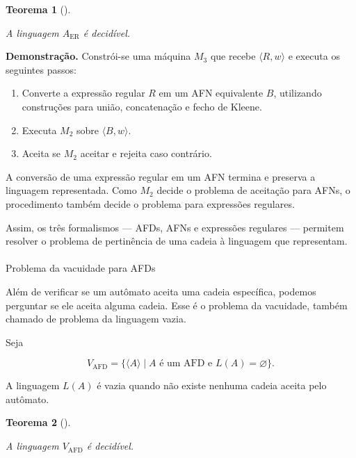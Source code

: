 \documentclass[
  brazilian,
  letterpaper,
]{book}
\makeatletter
\let\oldparagraph\paragraph
\renewcommand{\paragraph}{
    \@ifstar
      \xxxParagraphStar
      \xxxParagraphNoStar
  }
\newcommand{\xxxParagraphStar}[1]{\oldparagraph*{#1}\mbox{}}
\newcommand{\xxxParagraphNoStar}[1]{\oldparagraph{#1}\mbox{}}
\providecommand{\tightlist}{%
  \setlength{\itemsep}{0pt}\setlength{\parskip}{0pt}}
\theoremstyle{plain}
\newtheorem{theorem}{Teorema}[chapter]
\theoremstyle{definition}
\theoremstyle{remark}
\makeatother
\begin{document}
\begin{theorem}[]\protect\hypertarget{thm-er}{}\label{thm-er}

A linguagem \(A_{\mathrm{ER}}\) é decidível.

\end{theorem}

\textbf{Demonstração.} Constrói-se uma máquina \(M_3\) que recebe
\(\langle R,w\rangle\) e executa os seguintes passos:

\begin{enumerate}
\def\labelenumi{\arabic{enumi}.}
\tightlist
\item
  Converte a expressão regular \(R\) em um AFN equivalente \(B\),
  utilizando construções para união, concatenação e fecho de Kleene.
\item
  Executa \(M_2\) sobre \(\langle B,w\rangle\).
\item
  Aceita se \(M_2\) aceitar e rejeita caso contrário.
\end{enumerate}

A conversão de uma expressão regular em um AFN termina e preserva a
linguagem representada. Como \(M_2\) decide o problema de aceitação para
AFNs, o procedimento também decide o problema para expressões regulares.

Assim, os três formalismos --- AFDs, AFNs e expressões regulares ---
permitem resolver o problema de pertinência de uma cadeia à linguagem
que representam.

\paragraph{Problema da vacuidade para
AFDs}\label{problema-da-vacuidade-para-afds}

Além de verificar se um autômato aceita uma cadeia específica, podemos
perguntar se ele aceita alguma cadeia. Esse é o problema da vacuidade,
também chamado de problema da linguagem vazia.

Seja

\[
V_{\mathrm{AFD}}=\{\langle A\rangle\mid A\text{ é um AFD e }L(A)=\varnothing\}.
\]

A linguagem \(L(A)\) é vazia quando não existe nenhuma cadeia aceita
pelo autômato.

\begin{theorem}[]\protect\hypertarget{thm-afd-vazio}{}\label{thm-afd-vazio}

A linguagem \(V_{\mathrm{AFD}}\) é decidível.

\end{theorem}
\end{document}
